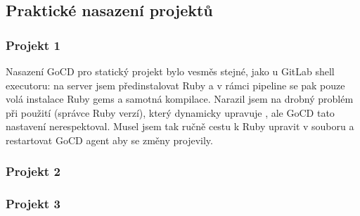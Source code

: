     \subsection{Praktické nasazení projektů}
        \subsubsection{Projekt 1}
            Nasazení GoCD pro statický projekt bylo vesměs stejné, jako u GitLab shell executoru: na server jsem předinstalovat Ruby a v rámci pipeline se pak pouze volá instalace Ruby gems a samotná kompilace. Narazil jsem na drobný problém při použití  (správce Ruby verzí), který dynamicky upravuje , ale GoCD tato nastavení nerespektoval. Musel jsem tak ručně cestu k Ruby upravit v souboru  a restartovat GoCD agent aby se změny projevily.

        \subsubsection{Projekt 2}
            \blind[2]

        \subsubsection{Projekt 3}
            \blind[2]
